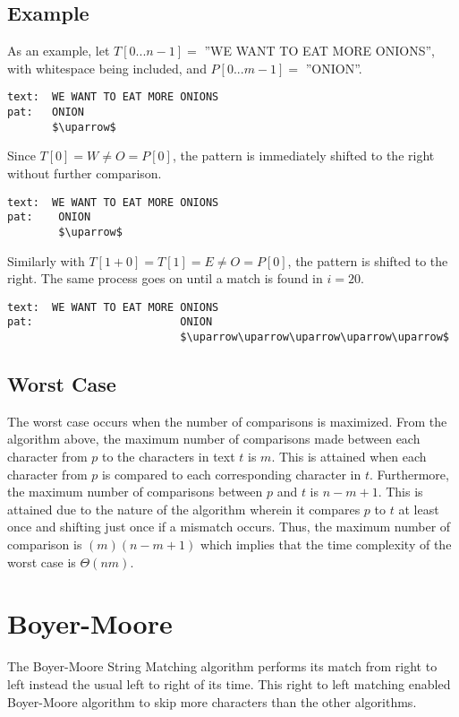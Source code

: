 \subsection{Example}
As an example, let $T[0...n-1]=$ ''WE WANT TO EAT MORE ONIONS'', with whitespace being included, and $P[0...m-1]=$ ''ONION''.


\begin{lstlisting}[mathescape=true, basicstyle=\LSTfont]
text:  WE WANT TO EAT MORE ONIONS
pat:   ONION
       $\uparrow$
\end{lstlisting}

Since $T[0] = W \neq O = P[0]$, the pattern is immediately shifted to the right without further comparison.

\begin{lstlisting}[mathescape=true, basicstyle=\LSTfont]
text:  WE WANT TO EAT MORE ONIONS
pat:    ONION
        $\uparrow$
\end{lstlisting}

Similarly with $T[1+0] = T[1] = E \neq O = P[0]$, the pattern is shifted to the right. The same process goes on until a match is found in $i=20$.

\begin{lstlisting}[mathescape=true, basicstyle=\LSTfont]
text:  WE WANT TO EAT MORE ONIONS
pat:                       ONION
                           $\uparrow\uparrow\uparrow\uparrow\uparrow$
\end{lstlisting}

\subsection{Worst Case}    
The worst case occurs when the number of comparisons is maximized. From the algorithm above, the maximum number of comparisons made between each character from $p$ to the characters in text $t$ is $m$. This is attained when each character from $p$ is compared to each corresponding character in $t$. Furthermore, the maximum number of comparisons between $p$ and $t$ is $n-m+1$. This is attained due to the nature of the algorithm wherein it compares $p$ to $t$ at least once and shifting just once if a mismatch occurs. Thus, the maximum number of comparison is $(m)(n-m+1)$ which implies that the time complexity of the worst case is $\Theta(nm)$.

\section{Boyer-Moore}		%
The Boyer-Moore String Matching algorithm performs its match from right to left instead the usual left to right of its time. This right to left matching enabled Boyer-Moore algorithm to skip more characters than the other algorithms\cite{boyerMoore}.

